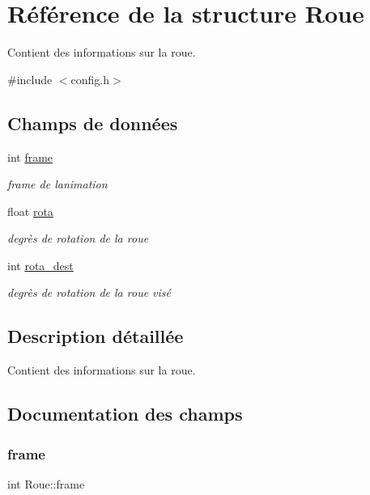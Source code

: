 \hypertarget{struct_roue}{}\section{Référence de la structure Roue}
\label{struct_roue}


Contient des informations sur la roue.  




{\ttfamily \#include $<$config.\+h$>$}

\subsection*{Champs de données}
\begin{DoxyCompactItemize}
\item 
int \hyperlink{struct_roue_af5c339a3c4887d600cb5524646f9ca8d}{frame}
\begin{DoxyCompactList}\small\item\em frame de l\textquotesingle{}animation \end{DoxyCompactList}\item 
float \hyperlink{struct_roue_a2d6c1ab5e9228e3422bfd830fce12ff9}{rota}
\begin{DoxyCompactList}\small\item\em degrès de rotation de la roue \end{DoxyCompactList}\item 
int \hyperlink{struct_roue_a69fdface0ca9109eb0d99c4ef83994a6}{rota\+\_\+dest}
\begin{DoxyCompactList}\small\item\em degrès de rotation de la roue visé \end{DoxyCompactList}\end{DoxyCompactItemize}


\subsection{Description détaillée}
Contient des informations sur la roue. 

\subsection{Documentation des champs}
\mbox{\label{struct_roue_af5c339a3c4887d600cb5524646f9ca8d}} 
\subsubsection{\texorpdfstring{frame}{frame}}
{\footnotesize\ttfamily int Roue\+::frame}



